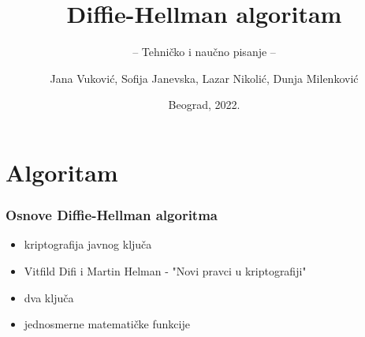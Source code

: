 \documentclass[14pt]{beamer}
\title{Diffie-Hellman algoritam}
\subtitle{-- Tehničko i naučno pisanje --}
\author{Jana Vuković, Sofija Janevska, Lazar Nikolić, Dunja Milenković}
\institute{Matematički fakultet\\Univerzitet u Beogradu}
\date{
	\footnotesize{Beograd, 2022.}	
}
\begin{document}
\begin{frame}
	\thispagestyle{empty}
	\titlepage
\end{frame}

\addtocounter{framenumber}{-1}

\section{Algoritam}

\begin{frame}[fragile]\frametitle{Osnove Diffie-Hellman algoritma}
	\begin{itemize}
		\item kriptografija javnog ključa
		\item Vitfild Difi i Martin Helman - "Novi pravci u kriptografiji"
		\item dva ključa
		\item jednosmerne matematičke funkcije
	\end{itemize}
\end{frame}

\end{document}
